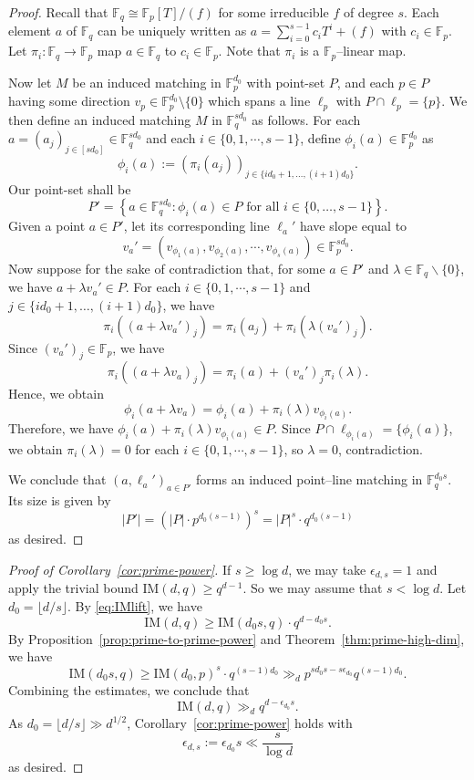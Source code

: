 \documentclass[12pt,reqno]{amsart}
\theoremstyle{plain}
\theoremstyle{definition}
\newcommand{\F}{\mathbb{F}}
\newcommand{\IM}{\mathrm{IM}}
\newcommand{\1}{\mathbf{1}}
\newcommand{\abs}[1]{\left|#1\right|}
\begin{document}
\begin{proof}
    Recall that $\F_q\cong \F_p[T]/(f)$ for some irreducible $f$ of degree $s$.
    Each element $a$ of $\F_q$ can be uniquely written as $a = \sum_{i=0}^{s-1} c_iT^i +(f)$ with $c_i\in \F_p$. Let $\pi_i: \F_q \to \F_p$ map $a \in \F_q$ to $c_i \in \F_p$. Note that $\pi_i$ is a $\F_p$--linear map.

    Now let $M$ be an induced matching in $\F_p^{d_0}$ with point-set $P$, and each $p\in P$ having some direction $v_p\in \F_p^{d_0}\setminus\{0\}$ which spans a line $\ell_p$ with $P\cap \ell_p = \{p\}$. We then define an induced matching $M$ in $\F_q^{sd_0}$ as follows. For each $a = (a_j)_{j\in [sd_0]} \in \F_q^{sd_0}$ and each $i \in \{0, 1, \cdots, s - 1\}$, define $\phi_i(a) \in \F_p^{d_0}$ as
    $$\phi_i(a) := (\pi_i(a_j))_{j\in \{id_0+1,\dots,(i+1)d_0\}}.$$
    Our point-set shall be 
    $$P' = \left\{a \in \F_q^{sd_0} : \phi_i(a)\in P\text{ for all }i\in \{0,\dots,s-1\}\right\}.$$ Given a point $a \in P'$, let its corresponding line $\ell_a'$ have slope equal to
    $$v_a' = (v_{\phi_1(a)}, v_{\phi_2(a)}, \cdots, v_{\phi_s(a)}) \in \F_p^{sd_0}.$$
    Now suppose for the sake of contradiction that, for some $a \in P'$ and $\lambda \in \F_q \backslash \{0\}$, we have $a + \lambda v_a' \in P$. For each $i \in \{0, 1, \cdots, s - 1\}$ and $j\in \{id_0+1,\dots,(i+1)d_0\}$, we have
    $$\pi_i((a + \lambda v_a')_j) = \pi_i(a_j) + \pi_i(\lambda (v_{a}')_j).$$
    Since $(v_{a}')_j \in \F_p$, we have
    $$\pi_i((a + \lambda v_a)_j) = \pi_i(a) + (v_{a}')_j \pi_i(\lambda).$$
    Hence, we obtain
    $$\phi_i(a + \lambda v_a) = \phi_i(a) + \pi_i(\lambda) v_{\phi_i(a)}.$$
    Therefore, we have $\phi_i(a) + \pi_i(\lambda) v_{\phi_i(a)} \in P$. Since $P \cap \ell_{\phi_i(a)} = \{\phi_i(a)\}$, we obtain $\pi_i(\lambda) = 0$ for each $i \in \{0, 1, \cdots, s - 1\}$, so $\lambda = 0$, contradiction.

    We conclude that $(a, \ell_a')_{a \in P'}$ forms an induced point--line matching in $\F_q^{d_0 s}$. Its size is given by
    $$\abs{P'} = (|P| \cdot p^{d_0(s - 1)})^s = |P|^s \cdot q^{d_0(s - 1)}$$
    as desired.
\end{proof}
\begin{proof}[Proof of  Corollary~\ref{cor:prime-power}]
    If $s \geq \log d$, we may take $\epsilon_{d, s} = 1$ and apply the trivial bound $\IM(d, q) \geq q^{d - 1}$. So we may assume that $s < \log d$. Let $d_0 = \lfloor d / s \rfloor$. By \eqref{eq:IMlift}, we have
    $$\IM(d, q) \geq \IM(d_0 s, q) \cdot q^{d - d_0 s}.$$
    By Proposition~\ref{prop:prime-to-prime-power} and Theorem~\ref{thm:prime-high-dim}, we have
    $$\IM(d_0 s, q) \geq \IM(d_0,p)^{s} \cdot q^{(s - 1)d_0} \gg_d p^{sd_0 s- s \epsilon_{d_0}} q^{(s - 1)d_0}.$$
    Combining the estimates, we conclude that
    $$\IM(d, q) \gg_d q^{d - \epsilon_{d_0} s}.$$
    As $d_0 = \lfloor d / s \rfloor \gg d^{1/2}$, Corollary~\ref{cor:prime-power} holds with
    $$\epsilon_{d, s} := \epsilon_{d_0} s \ll \frac{s}{\log d}$$
    as desired.
\end{proof}
\end{document}
